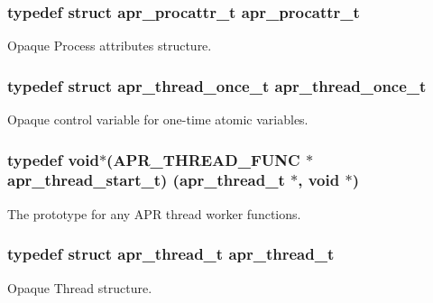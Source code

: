 \subsubsection[{\texorpdfstring{apr\+\_\+procattr\+\_\+t}{apr_procattr_t}}]{\setlength{\rightskip}{0pt plus 5cm}typedef struct {\bf apr\+\_\+procattr\+\_\+t} {\bf apr\+\_\+procattr\+\_\+t}}\hypertarget{group__apr__thread__proc_ga0d83919a6a0dd609598a864917f8b339}{}\label{group__apr__thread__proc_ga0d83919a6a0dd609598a864917f8b339}
Opaque Process attributes structure. 
\subsubsection[{\texorpdfstring{apr\+\_\+thread\+\_\+once\+\_\+t}{apr_thread_once_t}}]{\setlength{\rightskip}{0pt plus 5cm}typedef struct {\bf apr\+\_\+thread\+\_\+once\+\_\+t} {\bf apr\+\_\+thread\+\_\+once\+\_\+t}}\hypertarget{group__apr__thread__proc_ga91841bcf20d0579e8e6acc6d3c220ac1}{}\label{group__apr__thread__proc_ga91841bcf20d0579e8e6acc6d3c220ac1}
Opaque control variable for one-\/time atomic variables. 
\subsubsection[{\texorpdfstring{apr\+\_\+thread\+\_\+start\+\_\+t}{apr_thread_start_t}}]{\setlength{\rightskip}{0pt plus 5cm}typedef void$\ast$({\bf A\+P\+R\+\_\+\+T\+H\+R\+E\+A\+D\+\_\+\+F\+U\+NC} $\ast$ apr\+\_\+thread\+\_\+start\+\_\+t) ({\bf apr\+\_\+thread\+\_\+t} $\ast$, void $\ast$)}\hypertarget{group__apr__thread__proc_gaa1f88d2a6fe971ac200e466cae5f63e0}{}\label{group__apr__thread__proc_gaa1f88d2a6fe971ac200e466cae5f63e0}
The prototype for any A\+PR thread worker functions. 
\subsubsection[{\texorpdfstring{apr\+\_\+thread\+\_\+t}{apr_thread_t}}]{\setlength{\rightskip}{0pt plus 5cm}typedef struct {\bf apr\+\_\+thread\+\_\+t} {\bf apr\+\_\+thread\+\_\+t}}\hypertarget{group__apr__thread__proc_ga646c71351e723d84f8cc8c8d1d5937be}{}\label{group__apr__thread__proc_ga646c71351e723d84f8cc8c8d1d5937be}
Opaque Thread structure. 
